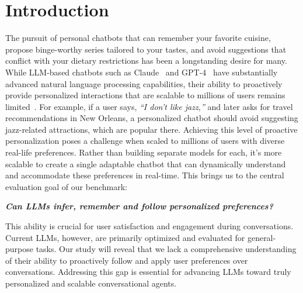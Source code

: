 \section{Introduction}

The pursuit of personal chatbots that can remember your favorite cuisine, propose binge-worthy series tailored to your tastes, and avoid suggestions that conflict with your dietary restrictions has been a longstanding desire for many. While LLM-based chatbots such as Claude~\citep{bai2022constitutional} and GPT-4~\citep{achiam2023gpt} have substantially advanced natural language processing capabilities, their ability to proactively provide personalized interactions that are scalable to millions of users remains limited~\citep{salemi2023lamp, li2023teach, jang2023personalized, tan2024democratizing, liu2024llms+, zhuang2024hydra, li2024dissecting, shaikh2024show, lee2024aligning}. For example, if a user says, \textit{``I don't like jazz,”} and later asks for travel recommendations in New Orleans, a personalized chatbot should avoid suggesting jazz-related attractions, which are popular there. Achieving this level of proactive personalization poses a challenge when scaled to millions of users with diverse real-life preferences. Rather than building separate models for each, it's more scalable to create a single adaptable chatbot that can dynamically understand and accommodate these preferences in real-time. This brings us to the central evaluation goal of our benchmark:

\begin{center}
\begin{tcolorbox}[
   enhanced,
   colback=gray!15,    %
   colframe=black,     %
   boxrule=1pt,        %
   arc=4pt,            %
   auto outer arc,
   boxsep=5pt          %
]
\centering
\textbf{\textit{Can LLMs infer, remember and follow personalized preferences?}}
\end{tcolorbox}
\end{center}

This ability is crucial for user satisfaction and engagement during conversations. Current LLMs, however, are primarily optimized and evaluated for general-purpose tasks. Our study will reveal that we lack a comprehensive understanding of their ability to proactively follow and apply user preferences over conversations. Addressing this gap is essential for advancing LLMs toward truly personalized and scalable conversational agents.

